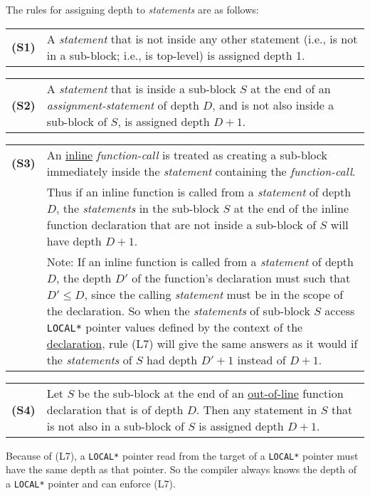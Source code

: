 \documentclass[12pt]{article}
\newcommand{\key}[1]{{\rm \bfseries #1}}
\newenvironment{indpar}[1][0.3in]%
	{\begin{list}{}%
		     {\setlength{\itemsep}{0in}%
		      \setlength{\topsep}{0in}%
		      \setlength{\parsep}{1ex}%
		      \setlength{\labelwidth}{#1}%
		      \setlength{\leftmargin}{#1}%
		      \addtolength{\leftmargin}{\labelsep}}%
	 \item}%
	{\end{list}}
\begin{document}
The rules for assigning depth to {\em statements} are as follows:
\begin{indpar}[0.2in]
\begin{tabular}{p{0.4in}p{5.0in}}
\key{(S1)}	& A {\em statement} that is not inside any other statement
                  (i.e., is not in a sub-block; i.e., is top-level)
		  is assigned depth 1.
\end{tabular}

\begin{tabular}{p{0.4in}p{5.0in}}
\key{(S2)}	& A {\em statement} that is inside a sub-block $S$ at the end
                  of an {\em assignment-statement} of depth $D$, and
		  is not also
		  inside a sub-block of $S$, is assigned depth $D+1$.
\end{tabular}

\begin{tabular}{p{0.4in}p{5.0in}}
\key{(S3)}	& An \underline{inline} {\em function-call} is treated
                  as creating a sub-block immediately inside
		  the {\em statement} containing the {\em function-call}.
\\[1ex]
		& Thus if an inline function is called from a {\em statement}
		  of depth $D$, the {\em statements} in the sub-block $S$ at the
		  end of the inline function declaration that are not inside
		  a sub-block of $S$ will have depth $D+1$.
\\[1ex]
		& Note: If an inline function is called from a {\em statement}
		  of depth $D$, the depth $D'$ of the function's declaration
		  must such that $D'\leq D$, since the calling {\em statement}
		  must be in the scope of the declaration.
		  So when the {\em statements}
		  of sub-block $S$ access {\tt *LOCAL*} pointer values
		  defined by the context of the \underline{declaration},
		  rule (L7) will give the same answers as it would if
		  the {\em statements} of $S$ had depth $D'+1$ instead of
		  $D+1$.
\end{tabular}

\begin{tabular}{p{0.4in}p{5.0in}}
\key{(S4)}	& Let $S$ be the sub-block at the end of an
                  \underline{out-of-line} function declaration that is of
		  depth $D$.  Then any statement in $S$ that is not also
		  in a sub-block of $S$ is assigned depth $D+1$.
\end{tabular}
\end{indpar}

Because of (L7), a {\tt *LOCAL*} pointer read from the target of a {\tt *LOCAL*}
pointer must have the same depth as that pointer.  So the compiler
always knows the depth of a {\tt *LOCAL*} pointer and can enforce
(L7).
\end{document}
